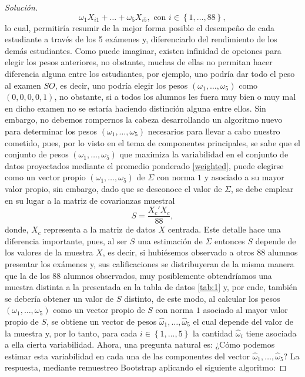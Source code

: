 \documentclass[10.5pt,notitlepage]{article}
\newenvironment{solucion}
  {\begin{proof}[Solución]}
  {\end{proof}}
\newcommand{\kis}[1]{\left\{ #1 \right\}}
\theoremstyle{plain}
\begin{document}
\begin{solucion}
\begin{equation}\label{weighted}
 \omega_1 X_{i1} +\hdots+\omega_{5}X_{i5}, \text{ con } i \in \kis{1, \hdots, 88},
\end{equation}
lo cual, permitiría resumir de la mejor forma posible el desempeño de cada estudiante a través de los 5 exámenes y, diferenciarlo del rendimiento de los demás estudiantes. Como puede imaginar, existen infinidad de opciones para elegir los pesos anteriores, no obstante, muchas de ellas no permitan hacer diferencia alguna entre los estudiantes, por ejemplo, uno podría dar todo el peso al examen \(SO\), es decir, uno podría elegir los pesos \((\omega_1, \hdots, \omega_5)\) como \((0,0,0,0,1)\), no obstante, si a todos los alumnos les fuera muy bien o muy mal en dicho examen no se estaría haciendo distinción alguna entre ellos. Sin embargo, no debemos rompernos la cabeza desarrollando un algoritmo nuevo para determinar los pesos \((\omega_1, \hdots, \omega_5)\) necesarios para llevar a cabo nuestro cometido, pues, por lo visto en el tema de componentes principales, se sabe que el conjunto de pesos \((\omega_1, \hdots, \omega_5)\) que maximiza la variabilidad en el conjunto de datos proyectados mediante el promedio ponderado \ref{weighted}, puede elegirse como un vector propio \((\omega_1, \hdots, \omega_5)\) de \(\Sigma\) con norma \(1\) y asociado a su mayor valor propio, sin embargo, dado que se desconoce el valor de \(\Sigma\), se debe emplear en su lugar a la matriz de covarianzas muestral
\begin{equation}\label{teodioroger}
  S = \frac{X_{c}'X_{c}}{88},  
\end{equation}
donde, \(X_{c}\) representa a la matriz de datos \(X\) centrada. Este detalle hace una diferencia importante, pues, al ser \(S\) una estimación de \(\Sigma\) entonces \(S\) depende de los valores de la muestra \(X\), es decir, si hubiésemos observado a otros \(88\) alumnos presentar los exámenes y, sus calificaciones se distribuyeran de la misma manera que la de los \(88\) alumnos observados, muy posiblemente obtendríamos una muestra distinta a la presentada en la tabla de datos \ref{tab:1} y, por ende, también se debería obtener un valor de \(S\) distinto, de este modo, al calcular los pesos \((\omega_1, \hdots, \omega_5)\) como un vector propio de \(S\) con norma \(1\) asociado al mayor valor propio de \(S\), se obtiene un vector de pesos \(\hat{\omega}_1, \hdots, \hat{\omega}_5\) el cual depende del valor de la muestra y, por lo tanto, para cada \(i \in \kis{1,\hdots,5}\) la cantidad \(\hat{\omega}_i\) tiene asociada a ella cierta variabilidad. Ahora, una pregunta natural es: ¿Cómo podemos estimar esta variabilidad en cada una de las componentes del vector \(\hat{\omega}_1, \hdots, \hat{\omega}_5\)? La respuesta, mediante remuestreo Bootstrap aplicando el siguiente algoritmo:

\end{solucion}
\end{document}
